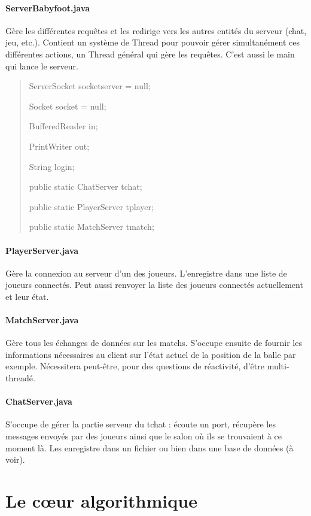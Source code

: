\documentclass[a4paper,12pt]{report}
\begin{document}
\paragraph{ServerBabyfoot.java}
Gère les différentes requêtes et les redirige vers les autres entités du serveur (chat, jeu, etc.). Contient un système de Thread pour pouvoir gérer simultanément ces différentes actions, un Thread général qui gère les requêtes. C'est aussi le main qui lance le serveur.
\begin{quote}
    ServerSocket socketserver = null;
    
	Socket socket = null;
    
	BufferedReader in;
    
	PrintWriter out;
    
	String login;
    
	public static ChatServer tchat;
    
	public static PlayerServer tplayer;
    
	public static MatchServer tmatch;
\end{quote}
\paragraph{PlayerServer.java}
Gère la connexion au serveur d'un des joueurs. L'enregistre dans une liste de joueurs connectés. Peut aussi renvoyer la liste des joueurs connectés actuellement et leur état.
\paragraph{MatchServer.java}
Gère tous les échanges de données sur les matchs. S'occupe ensuite de fournir les informations nécessaires au client sur l'état actuel de la position de la balle par exemple. Nécessitera peut-être, pour des questions de réactivité, d'être multi-threadé.
\paragraph{ChatServer.java}
S'occupe de gérer la partie serveur du tchat : écoute un port, récupère les messages envoyés par des joueurs ainsi que le salon où ils se trouvaient à ce moment là. Les enregistre dans un fichier ou bien dans une base de données (à voir).


\section{Le c\oe{}ur algorithmique}
\end{document}
